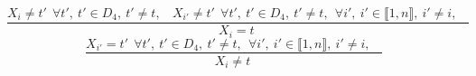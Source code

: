 $$\frac{X_{i} \neq t'~~\forall t',~t' \in D_{4},~t' \neq t,~~~~X_{i'} \neq t'~~\forall t',~t' \in D_{4},~t' \neq t,~~\forall i',~i' \in \llbracket1,n\rrbracket,~i' \neq i,~~~~}{X_{i}=t~}$$ $$\frac{X_{i'}=t'~~\forall t',~t' \in D_{4},~t' \neq t,~~\forall i',~i' \in \llbracket1,n\rrbracket,~i' \neq i,~~~~}{X_{i} \neq t~}$$ 